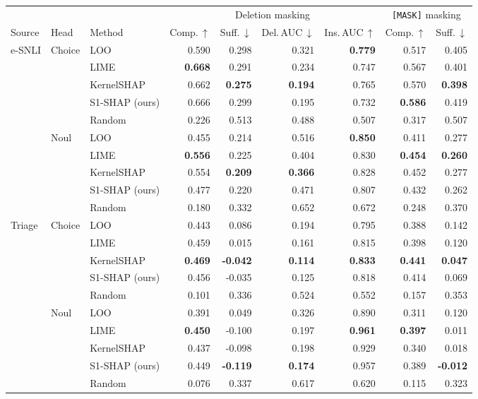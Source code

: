 \begin{tabular}{lllrrrrrr}
\toprule
 & & & \multicolumn{4}{c}{Deletion masking} & \multicolumn{2}{c}{\texttt{[MASK]} masking} \\
\cmidrule(lr){4-7}\cmidrule(lr){8-9}
Source & Head & Method & Comp.\,$\uparrow$ & Suff.\,$\downarrow$ & Del.\,AUC\,$\downarrow$ & Ins.\,AUC\,$\uparrow$ & Comp.\,$\uparrow$ & Suff.\,$\downarrow$ \\
\midrule
e-SNLI & Choice & LOO & 0.590 & 0.298 & 0.321 & \textbf{0.779} & 0.517 & 0.405 \\
 &  & LIME & \textbf{0.668} & 0.291 & 0.234 & 0.747 & 0.567 & 0.401 \\
 &  & KernelSHAP & 0.662 & \textbf{0.275} & \textbf{0.194} & 0.765 & 0.570 & \textbf{0.398} \\
 &  & S1-SHAP (ours) & 0.666 & 0.299 & 0.195 & 0.732 & \textbf{0.586} & 0.419 \\
 &  & Random & 0.226 & 0.513 & 0.488 & 0.507 & 0.317 & 0.507 \\
\cmidrule{2-9}
 & Noul & LOO & 0.455 & 0.214 & 0.516 & \textbf{0.850} & 0.411 & 0.277 \\
 &  & LIME & \textbf{0.556} & 0.225 & 0.404 & 0.830 & \textbf{0.454} & \textbf{0.260} \\
 &  & KernelSHAP & 0.554 & \textbf{0.209} & \textbf{0.366} & 0.828 & 0.452 & 0.277 \\
 &  & S1-SHAP (ours) & 0.477 & 0.220 & 0.471 & 0.807 & 0.432 & 0.262 \\
 &  & Random & 0.180 & 0.332 & 0.652 & 0.672 & 0.248 & 0.370 \\
\midrule
Triage & Choice & LOO & 0.443 & 0.086 & 0.194 & 0.795 & 0.388 & 0.142 \\
 &  & LIME & 0.459 & 0.015 & 0.161 & 0.815 & 0.398 & 0.120 \\
 &  & KernelSHAP & \textbf{0.469} & \textbf{-0.042} & \textbf{0.114} & \textbf{0.833} & \textbf{0.441} & \textbf{0.047} \\
 &  & S1-SHAP (ours) & 0.456 & -0.035 & 0.125 & 0.818 & 0.414 & 0.069 \\
 &  & Random & 0.101 & 0.336 & 0.524 & 0.552 & 0.157 & 0.353 \\
\cmidrule{2-9}
 & Noul & LOO & 0.391 & 0.049 & 0.326 & 0.890 & 0.311 & 0.120 \\
 &  & LIME & \textbf{0.450} & -0.100 & 0.197 & \textbf{0.961} & \textbf{0.397} & 0.011 \\
 &  & KernelSHAP & 0.437 & -0.098 & 0.198 & 0.929 & 0.340 & 0.018 \\
 &  & S1-SHAP (ours) & 0.449 & \textbf{-0.119} & \textbf{0.174} & 0.957 & 0.389 & \textbf{-0.012} \\
 &  & Random & 0.076 & 0.337 & 0.617 & 0.620 & 0.115 & 0.323 \\
\bottomrule
\end{tabular}
